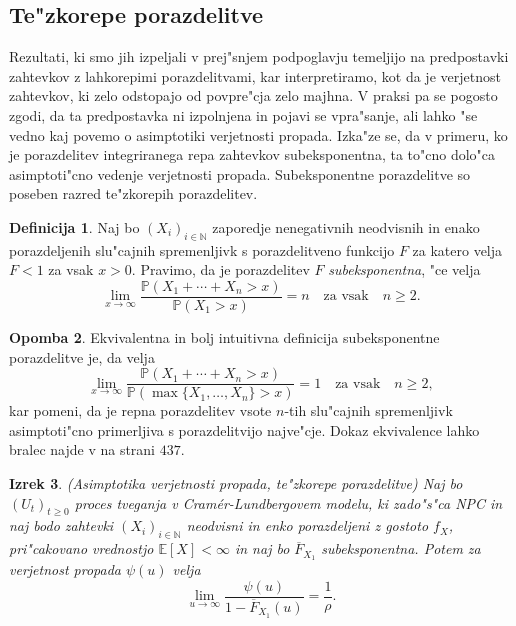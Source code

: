 \documentclass[12pt, a4paper, reqno]{amsart}
\theoremstyle{definition}
\newtheorem{definicija}{Definicija}[section]
\newtheorem{opomba}[definicija]{Opomba}
\theoremstyle{plain}
\newtheorem{izrek}[definicija]{Izrek}
\newcommand{\N}{\mathbb{N}}
\newcommand{\E}{\mathbb{E}}
\newcommand{\Prob}{\mathbb{P}}
\newcommand{\1}{\mathds{1}}
\begin{document}
        
    \subsection{Te"zkorepe porazdelitve}
        Rezultati, ki smo jih izpeljali v prej"snjem podpoglavju temeljijo na predpostavki zahtevkov
        z lahkorepimi porazdelitvami, kar interpretiramo, kot da je verjetnost zahtevkov, ki zelo 
        odstopajo od povpre"cja zelo majhna. V praksi pa se pogosto zgodi, da ta predpostavka ni 
        izpolnjena in pojavi se vpra"sanje, ali lahko "se vedno kaj povemo o asimptotiki verjetnosti 
        propada. Izka"ze se, da v primeru, ko je porazdelitev 
        integriranega repa zahtevkov subeksponentna, ta to"cno dolo"ca asimptoti"cno vedenje verjetnosti 
        propada. Subeksponentne porazdelitve so poseben razred te"zkorepih porazdelitev. 
        \begin{definicija}
            Naj bo $(X_i)_{i\in\N}$ zaporedje nenegativnih neodvisnih in enako porazdeljenih 
            slu"cajnih spremenljivk s porazdelitveno funkcijo $F$ za katero velja $F<1$ za vsak $x > 0$.
            Pravimo, da je porazdelitev $F$ \textit{subeksponentna}, "ce velja 
            \begin{equation*}
                \lim_{x\to\infty}\frac{\Prob\left(X_1 + \cdots + X_n > x\right)}{\Prob\left(X_1 > x\right)} = n \quad \text{za vsak} \quad n\geq2.
            \end{equation*}
            \label{def:subeksponentnaPorazdelitev}
        \end{definicija}

        \begin{opomba}
            Ekvivalentna in bolj intuitivna definicija subeksponentne porazdelitve je, da velja 
            \begin{equation*}
                \lim_{x\to\infty}\frac{\Prob\left(X_1 + \cdots + X_n > x\right)}{\Prob\left(\max\{X_1, \dots, X_n\} > x\right)} = 1 \quad \text{za vsak} \quad n\geq2, 
            \end{equation*}
            kar pomeni, da je repna porazdelitev vsote $n$-tih slu"cajnih spremenljivk asimptoti"cno
            primerljiva s porazdelitvijo najve"cje. Dokaz ekvivalence lahko bralec najde v \cite{9} na strani $437$.
        \end{opomba}
        
        \begin{izrek}(Asimptotika verjetnosti propada, te"zkorepe porazdelitve)
            Naj bo $(U_t)_{t\geq0}$ proces tveganja v Cramér-Lundbergovem modelu, ki zado"s"ca NPC in 
            naj bodo zahtevki $(X_i)_{i\in\N}$ neodvisni in enko porazdeljeni z gostoto $f_X$, 
            pri"cakovano vrednostjo $\E\left[X\right] < \infty$ in naj bo $\overline{F}_{X_1}$ subeksponentna.
            Potem za verjetnost propada $\psi(u)$ velja
            \begin{equation}
                \lim_{u\to\infty}\frac{\psi(u)}{1 - \overline{F}_{X_1}(u)} = \frac{1}{\rho}.
                \label{eq:tezkorepnePorazdelitveAsimptotika}
            \end{equation}
            \label{izr:tezkorepnePorazdelitveAsimptotika}
        \end{izrek}
\end{document}

